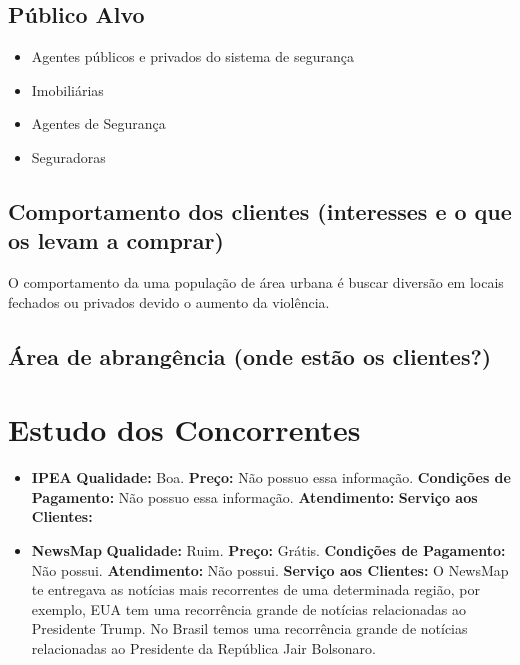 \documentclass[
	12pt,				%
	openright,			%
	twoside,			%
	a4paper,			%
	english,			%
	french,				%
	spanish,			%
	brazil,				%
	]{abntex2}
\begin{document}
\subsection{Público Alvo}

\begin{itemize}
	\item Agentes públicos e privados do sistema de segurança
	\item Imobiliárias
	\item Agentes de Segurança
	\item Seguradoras
\end{itemize}

\subsection{Comportamento dos clientes (interesses e o que os levam a comprar)}

O comportamento da uma população de área urbana é buscar diversão em locais fechados ou privados devido o aumento da violência. 


\subsection{Área de abrangência (onde estão os clientes?)}



\section{Estudo dos Concorrentes}

\begin{itemize}
	\item \textbf{IPEA} 
		\subitem \textbf{Qualidade:}  Boa.
		\subitem \textbf{Preço:} Não possuo essa informação.
		\subitem \textbf{Condições de Pagamento:} Não possuo essa informação.
		\subitem \textbf{Atendimento: } 
		\subitem \textbf{Serviço aos Clientes:} 

	\item \textbf{NewsMap} 
		\subitem \textbf{Qualidade: }  Ruim.
		\subitem \textbf{Preço: } Grátis.
		\subitem \textbf{Condições de Pagamento: } Não possui.
		\subitem \textbf{Atendimento: } Não possui.
		\subitem \textbf{Serviço aos Clientes: } O NewsMap te entregava as notícias mais recorrentes de uma determinada região, por exemplo, EUA tem uma recorrência grande de notícias relacionadas ao Presidente Trump. No Brasil temos uma recorrência grande de notícias relacionadas ao Presidente da República Jair Bolsonaro. 
		 
\end{itemize}
\end{document}
